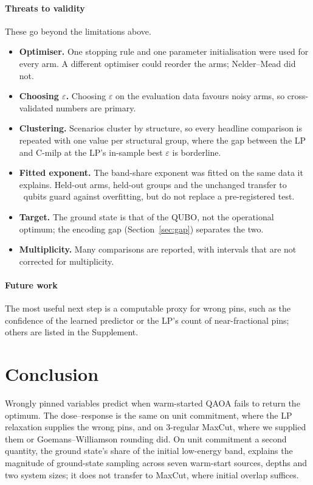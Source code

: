 \paragraph{Threats to validity} These go beyond the limitations above.
\begin{itemize}
\item \textbf{Optimiser.} One stopping rule and one parameter initialisation were used for every arm. A different optimiser could reorder the arms; Nelder--Mead did not.
\item \textbf{Choosing $\varepsilon$.} Choosing $\varepsilon$ on the evaluation data favours noisy arms, so cross-validated numbers are primary.
\item \textbf{Clustering.} Scenarios cluster by structure, so every headline comparison is repeated with one value per structural group, where the gap between the LP and C-milp at the LP's in-sample best $\varepsilon$ is borderline.
\item \textbf{Fitted exponent.} The band-share exponent was fitted on the same data it explains. Held-out arms, held-out groups and the unchanged transfer to \NLfour\ qubits guard against overfitting, but do not replace a pre-registered test.
\item \textbf{Target.} The ground state is that of the QUBO, not the operational optimum; the encoding gap (Section~\ref{sec:gap}) separates the two.
\item \textbf{Multiplicity.} Many comparisons are reported, with intervals that are not corrected for multiplicity.
\end{itemize}

\paragraph{Future work} The most useful next step is a computable proxy for wrong pins, such as the confidence of the learned predictor or the LP's count of near-fractional pins; others are listed in the Supplement.

\section{Conclusion}
\label{sec:conclusion}

Wrongly pinned variables predict when warm-started QAOA fails to return the optimum. The dose--response is the same on unit commitment, where the LP relaxation supplies the wrong pins, and on 3-regular MaxCut, where we supplied them or Goemans--Williamson rounding did. On unit commitment a second quantity, the ground state's share of the initial low-energy band, explains the magnitude of ground-state sampling across seven warm-start sources, depths and two system sizes; it does not transfer to MaxCut, where initial overlap suffices.

